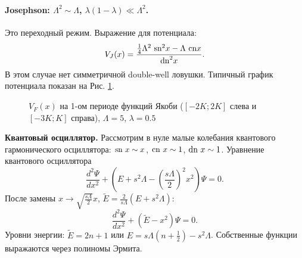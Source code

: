 \documentclass[12pt]{article}
\begin{document}
\paragraph{Josephson: $\Lambda^2 \sim \Lambda$, $\lambda(1 - \lambda) \ll \Lambda^2$.}
Это переходный режим.
Выражение для потенциала:
%
\begin{equation}
V_J(x) = \frac{\frac{1}{4} \Lambda^2 ~\textrm{sn}^2 x - \Lambda~\textrm{cn} x}{\textrm{dn}^2 x}.
\end{equation}
%
В этом случае нет симметричной double-well ловушки.
Типичный график потенциала показан на Рис. \ref{pic:potential_josephson}.
%
\begin{figure}[Ht!]
\caption{$V_F (x)$ на 1-ом периоде функций Якоби ($[-2K; 2K]$ слева и $[-3K; K]$ справа), $\Lambda = 5$, $\lambda = 0.5$}
\label{pic:potential_josephson}
\end{figure}
%

\textbf{Квантовый осциллятор.}
Рассмотрим в нуле малые колебания квантового гармонического осциллятора: $\textrm{sn}~x \sim x$, $\textrm{cn}~x \sim 1$, $\textrm{dn}~x \sim 1$.
Уравнение квантового осциллятора
%
\begin{equation}
\frac{d^2 \Psi}{dx^2} + (E + s^2 \Lambda - \left( \frac{s \Lambda}{2} \right)^2 x^2) \Psi = 0.
\end{equation}
%
После замены $x \to \sqrt{\frac{s \Lambda}{2}} x$, $\tilde{E} = \frac{2}{s \Lambda} (E + s^2 \Lambda)$:
%
\begin{equation}
\frac{d^2 \Psi}{dx^2} + (\tilde{E} - x^2) \Psi = 0.
\end{equation}
%
Уровни энергии: $\tilde{E} = 2n + 1$ или $E = s \Lambda (n + \frac{1}{2}) - s^2 \Lambda$.
Собственные функции выражаются через полиномы Эрмита.
\end{document}
